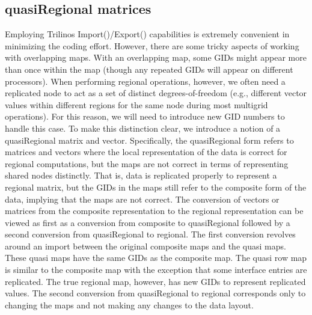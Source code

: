 \documentclass[11pt]{article}
\begin{document}
\subsection{quasiRegional matrices}
Employing Trilinos {\sf Import()}/{\sf Export()} capabilities is extremely convenient
in minimizing the coding effort. However, there are some tricky aspects
of working with overlapping maps. With an overlapping map, some GIDs
might appear more than once within the map (though any repeated GIDs
will appear on different processors). When performing regional
operations, however, we often need a replicated node to act as
a set of distinct degrees-of-freedom (e.g., different vector values within
different regions for the same node during most multigrid operations).
For this reason, we will need to introduce new GID numbers to handle
this case. To make this distinction clear, we introduce a notion of a
quasiRegional matrix and vector. Specifically, the quasiRegional form refers to matrices and vectors where the local representation of the data is correct for
regional computations, but the maps are not correct in terms of
representing shared nodes distinctly. That is, data is replicated properly
to represent a regional matrix, but the GIDs in the maps still refer to the composite form of the data, implying that the maps are not
correct. The conversion of vectors or matrices from the
composite representation to the regional representation can be viewed as
first as a conversion from composite to quasiRegional  followed by
a second conversion from quasiRegional to regional.
The first conversion revolves around an import between the original
composite maps and the quasi maps. These quasi maps have the same GIDs
as the composite map. The quasi row map is similar to the composite
map with the exception that some interface entries are replicated.
The true regional map, however, has new GIDs to represent replicated
values. The second conversion from quasiRegional to regional corresponds
only to changing the maps and not making any changes to the data layout.
\end{document}
